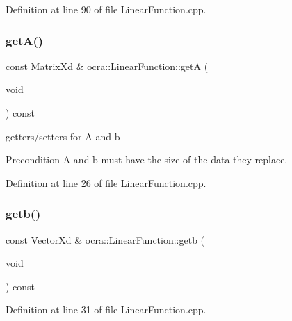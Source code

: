 Definition at line 90 of file Linear\+Function.\+cpp.

\hypertarget{classocra_1_1LinearFunction_a7035c5f9ab621e976e09560c85a12fb2}{}\label{classocra_1_1LinearFunction_a7035c5f9ab621e976e09560c85a12fb2} 
\subsubsection{\texorpdfstring{get\+A()}{getA()}}
{\footnotesize\ttfamily const Matrix\+Xd \& ocra\+::\+Linear\+Function\+::getA (\begin{DoxyParamCaption}\item[{void}]{ }\end{DoxyParamCaption}) const}

getters/setters for A and b \begin{DoxyPrecond}{Precondition}
A and b must have the size of the data they replace. 
\end{DoxyPrecond}


Definition at line 26 of file Linear\+Function.\+cpp.

\hypertarget{classocra_1_1LinearFunction_a485d83b0a3ad4c91e86f62494f9d7cef}{}\label{classocra_1_1LinearFunction_a485d83b0a3ad4c91e86f62494f9d7cef} 
\subsubsection{\texorpdfstring{getb()}{getb()}}
{\footnotesize\ttfamily const Vector\+Xd \& ocra\+::\+Linear\+Function\+::getb (\begin{DoxyParamCaption}\item[{void}]{ }\end{DoxyParamCaption}) const}



Definition at line 31 of file Linear\+Function.\+cpp.

\hypertarget{classocra_1_1LinearFunction_a08b286c3cdc1ab8407ba7a9ce9eba8c7}{}\label{classocra_1_1LinearFunction_a08b286c3cdc1ab8407ba7a9ce9eba8c7} 
